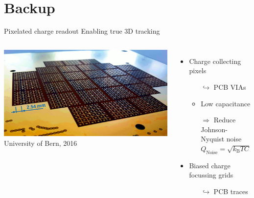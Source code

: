 \documentclass[]{beamer}
\newcommand*{\m}{\mathrm}
\newcommand*{\emphcol}{blue}
\begin{document}
\section{Backup}

\begin{frame}{Pixelated charge readout}{\color{\emphcol} Enabling true 3D tracking}
	\begin{columns}[c]
		\centering
		\includegraphics[width=\textwidth]{viper/pixies}\\
		{\tiny University of Bern, 2016}\\
		\begin{itemize}
			\item Charge collecting pixels
			\begin{itemize}
				\item[$\hookrightarrow$] PCB VIAs
				\item Low capacitance
				\item[$\Rightarrow$] Reduce Johnson-Nyquist noise $Q_{\m{Noise}} = \sqrt{k_{\m{B}}TC}$
			\end{itemize}
			\item Biased charge focussing grids
			\begin{itemize}
				\item[$\hookrightarrow$] PCB traces
			\end{itemize}
		\end{itemize}
	\end{columns}
\end{frame}
\end{document}

